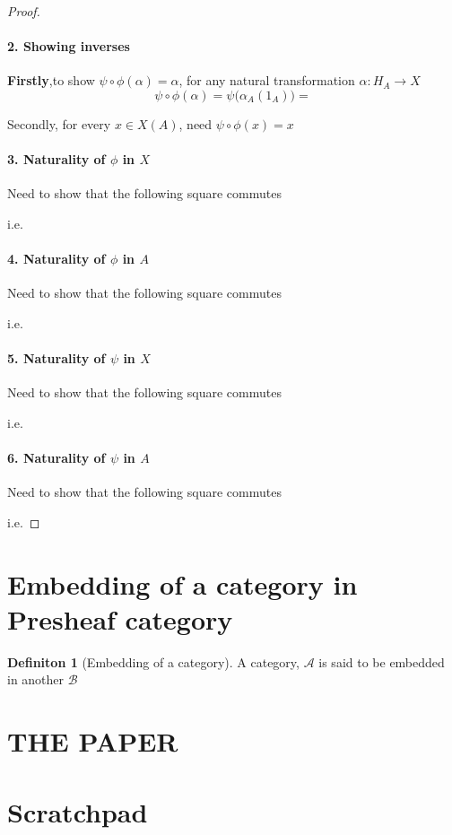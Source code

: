 \documentclass[18pt,a4paper]{extarticle}
\theoremstyle{definition}
\theoremstyle{definition}
\newtheorem{definition}{Definiton}[section]
\begin{document}
\begin{proof}
	\paragraph {2. Showing inverses} \textbf{Firstly},to show $\psi \circ \phi (\alpha) = \alpha $,
	for any natural transformation $\alpha: H_A \to X$\\

	\[ \psi \circ \phi (\alpha) = \psi \Big(\alpha_A(1_A) \Big) =  \]

	Secondly, for every $x \in X(A)$, need $\psi \circ \phi (x) = x$

	\paragraph{3. Naturality of $\phi$ in $X$}
	Need to show that the following square commutes

	i.e.
	\paragraph{4. Naturality of $\phi$ in $A$}
	Need to show that the following square commutes

	i.e.
	\paragraph{5. Naturality of $\psi$ in $X$}
	Need to show that the following square commutes

	i.e.
	\paragraph{6. Naturality of $\psi$ in $A$}
	Need to show that the following square commutes

	i.e.

\end{proof}
\section{Embedding of a category in Presheaf category}%

\begin{definition}[Embedding of a category] %
A category, $\mathcal{A}$  is said to be embedded in another $\mathcal{B}$
\end{definition} %


\newpage
\section{THE PAPER}%



\newpage
\section{Scratchpad}%


\end{document}
